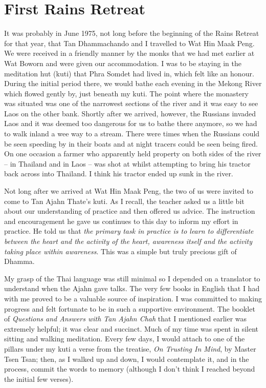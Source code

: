 \chapter{First Rains Retreat}

It was probably in June 1975, not long before the beginning of the Rains
Retreat for that year, that Tan Dhammachando and I travelled to Wat Hin
Maak Peng. We were received in a friendly manner by the monks that we
had met earlier at Wat Boworn and were given our accommodation. I was to
be staying in the meditation hut (kuti) that Phra Somdet had lived in,
which felt like an honour. During the initial period there, we would
bathe each evening in the Mekong River which flowed gently by, just
beneath my kuti. The point where the monastery was situated was one of
the narrowest sections of the river and it was easy to see Laos on the
other bank. Shortly after we arrived, however, the Russians invaded Laos
and it was deemed too dangerous for us to bathe there anymore, so we had
to walk inland a wee way to a stream. There were times when the Russians
could be seen speeding by in their boats and at night tracers could be
seen being fired. On one occasion a farmer who apparently held property
on both sides of the river -- in Thailand and in Laos -- was shot at
whilst attempting to bring his tractor back across into Thailand. I
think his tractor ended up sunk in the river.

Not long after we arrived at Wat Hin Maak Peng, the two of us were
invited to come to Tan Ajahn Thate's kuti. As I recall, the teacher
asked us a little bit about our understanding of practice and then
offered us advice. The instruction and encouragement he gave us
continues to this day to inform my effort in practice. He told us that
\emph{the primary task in practice is to learn to differentiate between
the heart and the activity of the heart, awareness itself and the
activity taking place within awareness}. This was a simple but truly
precious gift of Dhamma.

My grasp of the Thai language was still minimal so I depended on a
translator to understand when the Ajahn gave talks. The very few books
in English that I had with me proved to be a valuable source of
inspiration. I was committed to making progress and felt fortunate to be
in such a supportive environment. The booklet of \emph{Questions and
Answers with Tan Ajahn Chah} that I mentioned earlier was extremely
helpful; it was clear and succinct. Much of my time was spent
in silent sitting and walking meditation. Every few days, I would attach
to one of the pillars under my kuti a verse from the treatise, \emph{On
Trusting In Mind}, by Master Tsen Tsan; then, as I walked up and down, I
would contemplate it, and in the process, commit the words to memory
(although I don't think I reached beyond the initial few verses).

